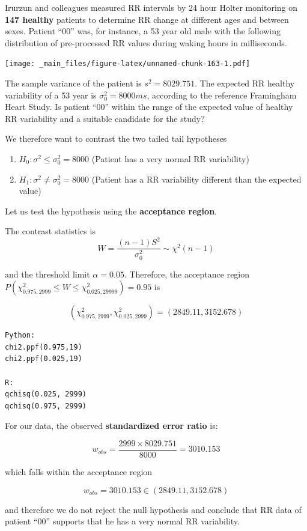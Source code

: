 \documentclass[
]{book}
\providecommand{\tightlist}{%
  \setlength{\itemsep}{0pt}\setlength{\parskip}{0pt}}
\begin{document}
Irurzun and colleagues measured RR intervals by 24 hour Holter monitoring on \textbf{147 healthy} patients to determine RR change at different ages and between sexes\citep{irurzun2021rr}. Patient ``00'' was, for instance, a 53 year old male with the following distribution of pre-processed RR values during waking hours in milliseconds.

\texttt{[image: \_main\_files/figure-latex/unnamed-chunk-163-1.pdf]}

The sample variance of the patient is \(s^2=8029.751\). The expected RR healthy variability of a 53 year is \(\sigma^2_0=8000ms\), according to the reference Framingham Heart Study. Is patient ``00'' within the range of the expected value of healthy RR variability and a suitable candidate for the study?

We therefore want to contrast the two tailed tail hypotheses

\begin{enumerate}
\def\labelenumi{\alph{enumi}.}
\tightlist
\item
  \(H_0:\sigma^2 \leq \sigma_0^2=8000\) (Patient has a very normal RR variability)
\item
  \(H_1:\sigma^2 \neq \sigma_0^2=8000\) (Patient has a RR variability different than the expected value)
\end{enumerate}

Let us test the hypothesis using the \textbf{acceptance region}.

The contrast statistics is \[W=\frac{(n-1)S^2}{\sigma_0^2} \sim \chi^2(n-1)\]

and the threshold limit \(\alpha=0.05\). Therefore, the acceptance region \(P(\chi^2_{0.975,2999} \leq W\leq \chi^2_{0.025,29999})=0.95\) is

\[(\chi^2_{0.975,2999}, \chi^2_{0.025,2999})=(2849.11,3152.678)\]

\begin{verbatim}
Python:
chi2.ppf(0.975,19)
chi2.ppf(0.025,19)

R:
qchisq(0.025, 2999)
qchisq(0.975, 2999)
\end{verbatim}

For our data, the observed \textbf{standardized error ratio} is:

\[w_{obs}=\frac{2999 \times8029.751}{8000}=3010.153\]

which falls within the acceptance region

\[w_{obs}=3010.153\in (2849.11,3152.678)\]

and therefore we do not reject the null hypothesis and conclude that RR data of patient ``00'' supports that he has a very normal RR variability.
\end{document}
